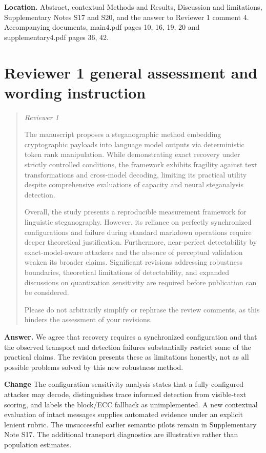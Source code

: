 \documentclass[11pt]{article}
\newenvironment{reviewcomment}{\begin{quote}\color{commentgray}\itshape}{\end{quote}}
\begin{document}
\textbf{Location.} Abstract, contextual Methods and Results, Discussion and limitations, Supplementary Notes S17 and S20, and the answer to Reviewer 1 comment 4. Accompanying documents, main4.pdf pages 10, 16, 19, 20 and supplementary4.pdf pages 36, 42.



\section*{Reviewer 1 general assessment and wording instruction}\label{resp:reviewer1_general}
\begin{reviewcomment}
Reviewer 1

The manuscript proposes a steganographic method embedding cryptographic payloads into language model outputs via deterministic token rank manipulation. While demonstrating exact recovery under strictly controlled conditions, the framework exhibits fragility against text transformations and cross-model decoding, limiting its practical utility despite comprehensive evaluations of capacity and neural steganalysis detection.

Overall, the study presents a reproducible measurement framework for linguistic steganography. However, its reliance on perfectly synchronized configurations and failure during standard markdown operations require deeper theoretical justification. Furthermore, near-perfect detectability by exact-model-aware attackers and the absence of perceptual validation weaken its broader claims. Significant revisions addressing robustness boundaries, theoretical limitations of detectability, and expanded discussions on quantization sensitivity are required before publication can be considered.

Please do not arbitrarily simplify or rephrase the review comments, as this hinders the assessment of your revisions.
\end{reviewcomment}


\textbf{Answer.} We agree that recovery requires a synchronized configuration and that the observed transport and detection failures substantially restrict some of the practical claims. The revision presents these as limitations honestly, not as all possible problems solved by this new robustness method.

\textbf{Change} The configuration sensitivity analysis states that a fully configured attacker may decode, distinguishes trace informed detection from visible-text scoring, and labels the block/ECC fallback as unimplemented. A new contextual evaluation of intact messages supplies automated evidence under an explicit lenient rubric. The unsuccessful earlier semantic pilots remain in Supplementary Note S17. The additional transport diagnostics are illustrative rather than population estimates.
\end{document}

